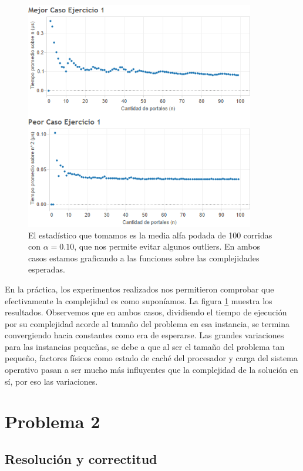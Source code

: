 \documentclass{article}
\theoremstyle{definition}
\theoremstyle{remark}
\begin{document}
\begin{figure}
\centering
\includegraphics[width=10cm]{ex1}
\caption{El estadístico que tomamos es la media alfa podada de 100 corridas con $\alpha = 0.10$, que nos permite evitar algunos outliers. En ambos casos estamos graficando a las funciones sobre las complejidades esperadas. \label{grf:ex1}}
\end{figure}

En la práctica, los experimentos realizados nos permitieron comprobar que efectivamente la complejidad es como suponíamos. La figura \ref{grf:ex1} muestra los resultados. 
Observemos que en ambos casos, dividiendo el tiempo de ejecución por su complejidad acorde al tamaño del problema en esa instancia, se termina convergiendo hacia constantes como era de esperarse.
Las grandes variaciones para las instancias pequeñas, se debe a que al ser el tamaño del problema tan pequeño, factores físicos como estado de caché del procesador y carga del sistema operativo pasan a ser mucho más influyentes que la complejidad de la solución en sí, por eso las variaciones.

\pagebreak

\section{Problema 2}

\subsection{Resolución y correctitud}
\end{document}

